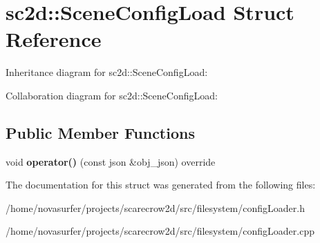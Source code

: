 \hypertarget{structsc2d_1_1SceneConfigLoad}{}\section{sc2d\+:\+:Scene\+Config\+Load Struct Reference}
\label{structsc2d_1_1SceneConfigLoad}


Inheritance diagram for sc2d\+:\+:Scene\+Config\+Load\+:


Collaboration diagram for sc2d\+:\+:Scene\+Config\+Load\+:
\subsection*{Public Member Functions}
\begin{DoxyCompactItemize}
\item 
\mbox{\label{structsc2d_1_1SceneConfigLoad_a8aba456fd72b4dabc1a4a396f2596150}} 
void {\bfseries operator()} (const json \&obj\+\_\+json) override
\end{DoxyCompactItemize}


The documentation for this struct was generated from the following files\+:\begin{DoxyCompactItemize}
\item 
/home/novasurfer/projects/scarecrow2d/src/filesystem/config\+Loader.\+h\item 
/home/novasurfer/projects/scarecrow2d/src/filesystem/config\+Loader.\+cpp\end{DoxyCompactItemize}
